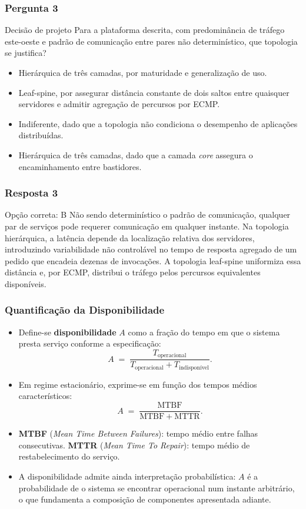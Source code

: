 \documentclass[aspectratio=169]{beamer}
\begin{document}
\begin{frame}
\frametitle{Pergunta 3}
\begin{pergunta}{Decisão de projeto}
Para a plataforma descrita, com predominância de tráfego este-oeste e padrão de comunicação entre pares não determinístico, que topologia se justifica?
\begin{itemize}
    \item[A)] Hierárquica de três camadas, por maturidade e generalização de uso.
    \item[B)] Leaf-spine, por assegurar distância constante de dois saltos entre quaisquer servidores e admitir agregação de percursos por ECMP.
    \item[C)] Indiferente, dado que a topologia não condiciona o desempenho de aplicações distribuídas.
    \item[D)] Hierárquica de três camadas, dado que a camada \emph{core} assegura o encaminhamento entre bastidores.
\end{itemize}
\end{pergunta}
\end{frame}

\begin{frame}
\frametitle{Resposta 3}
\begin{resposta}{Opção correta: B}
Não sendo determinístico o padrão de comunicação, qualquer par de serviços pode requerer comunicação em qualquer instante. Na topologia hierárquica, a latência depende da localização relativa dos servidores, introduzindo variabilidade não controlável no tempo de resposta agregado de um pedido que encadeia dezenas de invocações. A topologia leaf-spine uniformiza essa distância e, por ECMP, distribui o tráfego pelos percursos equivalentes disponíveis.
\end{resposta}
\end{frame}

\begin{frame}
\frametitle{Quantificação da Disponibilidade}
\begin{itemize}
    \setlength\itemsep{0.35cm}
    \item Define-se \textbf{disponibilidade} $A$ como a fração do tempo em que o sistema presta serviço conforme a especificação:
    \[
      A \;=\; \frac{T_{\text{operacional}}}{T_{\text{operacional}} + T_{\text{indisponível}}} .
    \]
    \item Em regime estacionário, exprime-se em função dos tempos médios característicos:
    \[
      A \;=\; \frac{\mathrm{MTBF}}{\mathrm{MTBF} + \mathrm{MTTR}} .
    \]
    \item \textbf{MTBF} (\emph{Mean Time Between Failures}): tempo médio entre falhas consecutivas. \textbf{MTTR} (\emph{Mean Time To Repair}): tempo médio de restabelecimento do serviço.
    \item A disponibilidade admite ainda interpretação probabilística: $A$ é a probabilidade de o sistema se encontrar operacional num instante arbitrário, o que fundamenta a composição de componentes apresentada adiante.
\end{itemize}
\end{frame}
\end{document}
